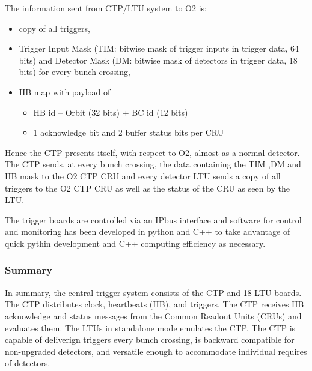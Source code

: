 The information sent from CTP/LTU system to O2 is:
\begin{itemize}
\item copy of all triggers,
\item Trigger Input Mask (TIM: bitwise mask of trigger inputs in trigger data, 64 bits) and Detector Mask (DM: bitwise mask of detectors in trigger data, 18 bits) for every bunch crossing, 
\item HB map with payload of  
\begin{itemize}
\item HB id – Orbit (32 bits)  + BC id (12 bits)
\item 1 acknowledge bit and 2 buffer status bits per CRU
\end{itemize}
\end{itemize}
Hence the CTP presents itself, with respect to O2, almost as a  normal detector. The CTP sends, at every bunch crossing, the data containing the TIM ,DM  and HB mask to the O2 CTP CRU  and every detector LTU sends a  copy of all triggers to the O2 CTP CRU as well as the status of the CRU as seen by the LTU.


The trigger boards are controlled via an IPbus interface \cite{Larrea:2015wra} and software for control and monitoring has been developed in python and C++ to take advantage of quick pythin development and C++ computing efficiency as necessary.

\subsubsection{Summary}
In summary, the central trigger system consists of the CTP and 18 LTU boards. The CTP distributes clock, heartbeats (HB), and triggers. The CTP receives HB acknowledge and status messages from the Common Readout Units (CRUs) and evaluates them. The LTUs in standalone mode emulates the CTP. The CTP is capable of deliverign triggers every bunch crossing, is backward compatible for non-upgraded detectors, and versatile enough to accommodate individual requires of detectors. 

